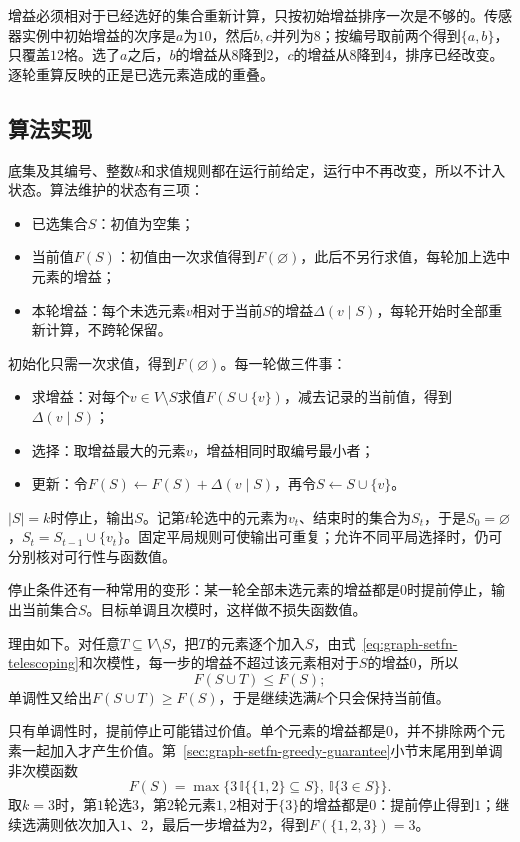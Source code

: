 增益必须相对于已经选好的集合重新计算，只按初始增益排序一次是不够的。传感器实例中初始增益的次序是$a$为$10$，然后$b,c$并列为$8$；按编号取前两个得到$\{a,b\}$，只覆盖$12$格。选了$a$之后，$b$的增益从$8$降到$2$，$c$的增益从$8$降到$4$，排序已经改变。逐轮重算反映的正是已选元素造成的重叠。

\subsection{算法实现}
\label{sec:graph-setfn-greedy}

底集及其编号、整数$k$和求值规则都在运行前给定，运行中不再改变，所以不计入状态。算法维护的状态有三项：
\begin{itemize}
  \item 已选集合$S$：初值为空集；
  \item 当前值$F(S)$：初值由一次求值得到$F(\varnothing)$，此后不另行求值，每轮加上选中元素的增益；
  \item 本轮增益：每个未选元素$v$相对于当前$S$的增益$\Delta(v\mid S)$，每轮开始时全部重新计算，不跨轮保留。
\end{itemize}
初始化只需一次求值，得到$F(\varnothing)$。每一轮做三件事：
\begin{itemize}
  \item 求增益：对每个$v\in V\setminus S$求值$F(S\cup\{v\})$，减去记录的当前值，得到$\Delta(v\mid S)$；
  \item 选择：取增益最大的元素$v$，增益相同时取编号最小者；
  \item 更新：令$F(S)\gets F(S)+\Delta(v\mid S)$，再令$S\gets S\cup\{v\}$。
\end{itemize}
$|S|=k$时停止，输出$S$。记第$t$轮选中的元素为$v_t$、结束时的集合为$S_t$，于是$S_0=\varnothing$，$S_t=S_{t-1}\cup\{v_t\}$。固定平局规则可使输出可重复；允许不同平局选择时，仍可分别核对可行性与函数值。

停止条件还有一种常用的变形：某一轮全部未选元素的增益都是$0$时提前停止，输出当前集合$S$。目标单调且次模时，这样做不损失函数值。

理由如下。对任意$T\subseteq V\setminus S$，把$T$的元素逐个加入$S$，由式~\eqref{eq:graph-setfn-telescoping}和次模性，每一步的增益不超过该元素相对于$S$的增益$0$，所以
\[
  F(S\cup T)\leq F(S);
\]
单调性又给出$F(S\cup T)\geq F(S)$，于是继续选满$k$个只会保持当前值。

只有单调性时，提前停止可能错过价值。单个元素的增益都是$0$，并不排除两个元素一起加入才产生价值。第~\ref{sec:graph-setfn-greedy-guarantee}小节末尾用到单调非次模函数
\[
  F(S)=\max\bigl\{3\,\mathbb I\{\{1,2\}\subseteq S\},\ \mathbb I\{3\in S\}\bigr\}.
\]
取$k=3$时，第$1$轮选$3$，第$2$轮元素$1,2$相对于$\{3\}$的增益都是$0$：提前停止得到$1$；继续选满则依次加入$1$、$2$，最后一步增益为$2$，得到$F(\{1,2,3\})=3$。

